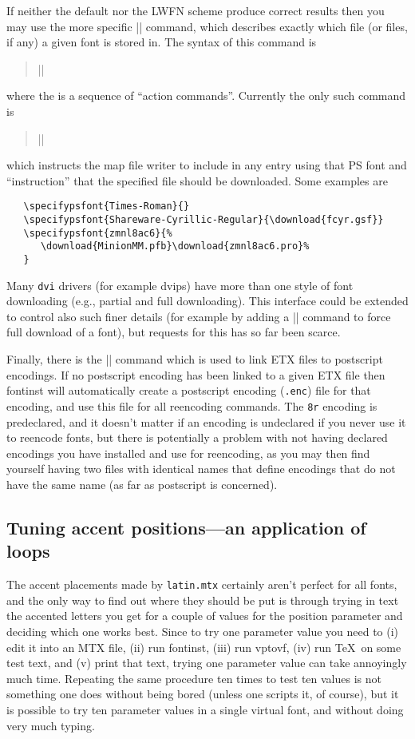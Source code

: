 \documentclass[a4paper]{ltxguide}
\newcommand*{\meta}{\m}
\newcommand*{\marg}{\arg}
\newcommand*{\setfilename}[1]{\texttt{#1}}
\newcommand*{\setpackagename}[1]{\textsf{#1}}
\newcommand{\dvips}   {\setpackagename{dvips}\xspace}
\newcommand{\fontinst}{\setpackagename{font\-inst}\xspace}
\newcommand{\dvi}{\setfilename{dvi}\xspace}
\newcommand{\vptovf}{\setpackagename{vptovf}\xspace}
\begin{document}
If neither the default nor the LWFN scheme produce correct results 
then you may use the more specific |\specifypsfont| command, which 
describes exactly which file (or files, if any) a given font is stored 
in. The syntax of this command is
\begin{quote}
  |\specifypsfont|\marg{PS font name}\marg{actions}
\end{quote}
where the \meta{actions} is a sequence of ``action commands''. 
Currently the only such command is
\begin{quote}
  |\download|\marg{file}
\end{quote}
which instructs the map file writer to include in any entry using 
that PS font and ``instruction'' that the specified file should be 
downloaded. Some examples are
\begin{verbatim}
   \specifypsfont{Times-Roman}{}
   \specifypsfont{Shareware-Cyrillic-Regular}{\download{fcyr.gsf}}
   \specifypsfont{zmnl8ac6}{%
      \download{MinionMM.pfb}\download{zmnl8ac6.pro}%
   }
\end{verbatim}
Many \dvi drivers (for example \dvips) have more than one style of 
font downloading (e.g., partial and full downloading). This interface 
could be extended to control also such finer details (for example by 
adding a |\fulldownload| command to force full download of a font), 
but requests for this has so far been scarce.

Finally, there is the |\declarepsencoding| command which is used to 
link ETX files to postscript encodings. If no postscript encoding has 
been linked to a given ETX file then \fontinst will 
automatically create a postscript encoding (\texttt{.enc}) file for 
that encoding, and use this file for all reencoding commands. 
The \texttt{8r} encoding is predeclared, and it doesn't 
matter if an encoding is undeclared if you never use it to reencode 
fonts, but there is potentially a problem with not having declared 
encodings you have installed and use for reencoding, as you may then 
find yourself having two files with identical names that define 
encodings that do not have the same name (as far as postscript is 
concerned).



\subsection{Tuning accent positions---an application of loops}

The accent placements made by \texttt{latin.mtx} certainly aren't 
perfect for all fonts, and the only way to find out where they should 
be put is through trying in text the accented letters you get for a 
couple of values for the position parameter and deciding which one 
works best. Since to try one parameter value you need to (i) edit it 
into an MTX file, (ii) run \fontinst, (iii) run 
\vptovf, (iv) run \TeX\ on some test text, and (v) print that 
text, trying one parameter value can take annoyingly much time. 
Repeating the same procedure ten times to test ten values is not 
something one does without being bored (unless one scripts it, of 
course), but it is possible to try ten parameter values in a single 
virtual font, and without doing very much typing.
\end{document}

